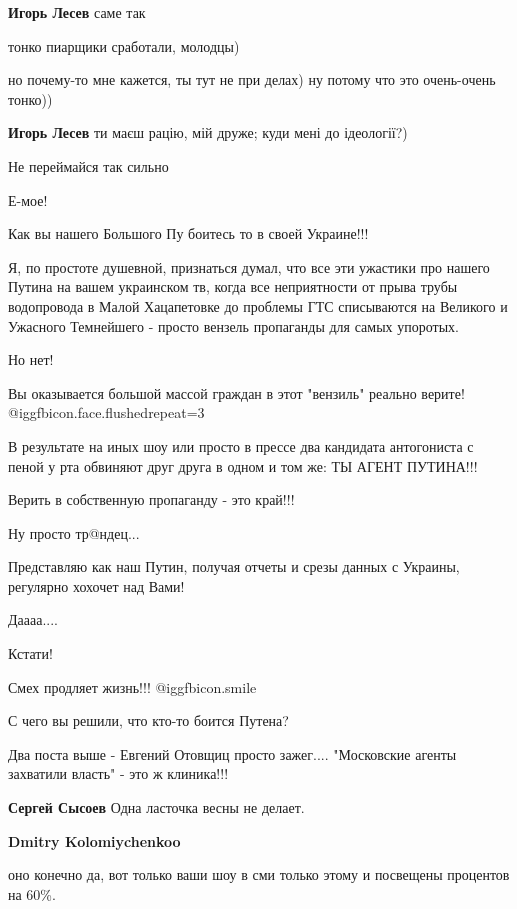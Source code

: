 \begin{itemize}
\begin{itemize}
\textbf{Игорь Лесев} саме так

тонко пиарщики сработали, молодцы)

но почему-то мне кажется, ты тут не при делах) ну потому что это очень-очень тонко))

\textbf{Игорь Лесев} ти маєш рацію, мій друже; куди мені до ідеології?)

Не переймайся так сильно
\end{itemize} %

Е-мое!

Как вы нашего Большого Пу боитесь то в своей Украине!!!

Я, по простоте душевной, признаться думал, что все эти ужастики про нашего
Путина на вашем украинском тв, когда все неприятности от прыва трубы
водопровода в Малой Хацапетовке до проблемы ГТС списываются на Великого и
Ужасного Темнейшего - просто вензель пропаганды для самых упоротых.

Но нет!

Вы оказывается большой массой граждан в этот "вензиль" реально верите! @igg{fbicon.face.flushed}{repeat=3} 

В результате на иных шоу или просто в прессе два кандидата антогониста с пеной
у рта обвиняют друг друга в одном и том же: ТЫ АГЕНТ ПУТИНА!!!

Верить в собственную пропаганду - это край!!!

Ну просто тр@ндец...

Представляю как наш Путин, получая отчеты и срезы данных с Украины, регулярно хохочет над Вами!

Даааа....

Кстати!

Смех продляет жизнь!!!
 @igg{fbicon.smile} 

\begin{itemize} %
С чего вы решили, что кто-то боится Путена?

Два поста выше - Евгений Отовщиц просто зажег....
"Московские агенты захватили власть" - это ж клиника!!!

\textbf{Сергей Сысоев} Одна ласточка весны не делает.

\textbf{Dmitry Kolomiychenkoo} 

оно конечно да, вот только ваши шоу в сми только этому и посвещены процентов на
60\%.


\end{itemize}
\end{itemize}
